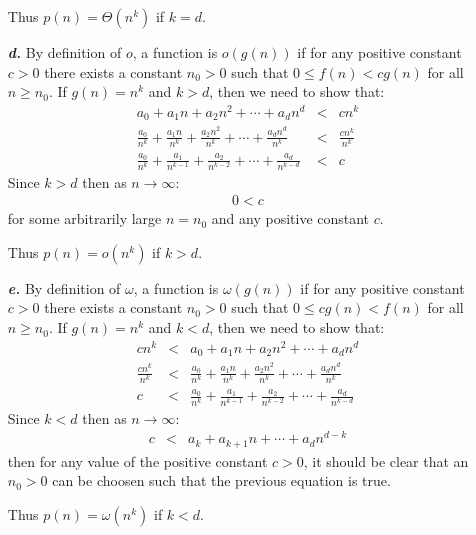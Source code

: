 \begin{enumerate}
		Thus $p(n) = \Theta(n^k)$ if $k = d$.
	\item[\textbf{\textit{d.}}] By definition of $o$, a function is $o(g(n))$ if for any positive constant $c > 0$ there exists a constant $n_0 > 0$ such that $0 \leq f(n) < c g(n)$ for all $n \geq n_0$. If $g(n) = n^k$ and $k > d$, then we need to show that:
		\begin{eqnarray*}
			a_0 + a_1 n + a_2 n^2 + \cdots + a_d n^d & < & c n^k \\
			\frac{a_0}{n^k} + \frac{a_1 n}{n^k} + \frac{a_2 n^2}{n^k} + \cdots + \frac{a_d n^d}{n^k} & < & \frac{c n^k}{n^k} \\
			\frac{a_0}{n^k} + \frac{a_1}{n^{k-1}} + \frac{a_2}{n^{k-2}} + \cdots + \frac{a_d}{n^{k-d}} & < & c
		\end{eqnarray*}
		Since $k > d$ then as $n \rightarrow \infty$:
		\begin{eqnarray*}
			0 < c
		\end{eqnarray*}
		for some arbitrarily large $n = n_0$ and any positive constant $c$.

		Thus $p(n) = o(n^k)$ if $k > d$.
	\item[\textbf{\textit{e.}}] By definition of $\omega$, a function is $\omega(g(n))$ if for any positive constant $c > 0$ there exists a constant $n_0 > 0$ such that $0 \leq c g(n) < f(n)$ for all $n \geq n_0$. If $g(n) = n^k$ and $k < d$, then we need to show that:
		\begin{eqnarray*}
			c n^k & < & a_0 + a_1 n + a_2 n^2 + \cdots + a_d n^d \\
			\frac{c n^k}{n^k} & < & \frac{a_0}{n^k} + \frac{a_1 n}{n^k} + \frac{a_2 n^2}{n^k} + \cdots + \frac{a_d n^d}{n^k} \\
			c & < & \frac{a_0}{n^k} + \frac{a_1}{n^{k-1}} + \frac{a_2}{n^{k-2}} + \cdots + \frac{a_d}{n^{k-d}}
		\end{eqnarray*}
		Since $k < d$ then as $n \rightarrow \infty$:
		\begin{eqnarray*}
			c & < & a_k + a_{k+1} n + \cdots + a_d n^{d-k}
		\end{eqnarray*}
		then for any value of the positive constant $c > 0$, it should be clear that an $n_0 > 0$ can be choosen such that the previous equation is true.

		Thus $p(n) = \omega(n^k)$ if $k < d$.
\end{enumerate}
